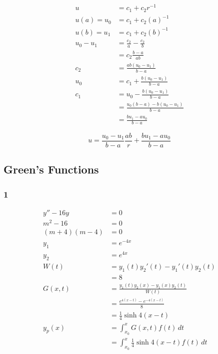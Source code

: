 \documentclass{article}
\begin{document}
\begin{align*}
  u          & = c_1 + c_2 r^{-1}                          \\
  u(a) = u_0 & = c_1 + c_2 (a)^{-1}                        \\
  u(b) = u_1 & = c_1 + c_2 (b)^{-1}                        \\
  u_0 - u_1  & = \frac{c_2}{a} - \frac{c_2}{b}             \\
             & = c_2 \frac{b - a}{a b}                     \\
  c_2        & = \frac{a b (u_0 - u_1)}{b - a}             \\
  u_0        & = c_1 + \frac{b (u_0 - u_1)}{b - a}         \\
  c_1        & = u_0 - \frac{b (u_0 - u_1)}{b - a}         \\
             & = \frac{u_0 (b - a) - b (u_0 - u_1)}{b - a} \\
             & = \frac{b u_1 - a u_0}{b - a}
\end{align*}

\[u = \frac{u_0 - u_1}{b - a} \frac{a b}{r} + \frac{b u_1 - a u_0}{b - a}\]

\subsection{Green's Functions}

\subsubsection{1}

\begin{align*}
  y'' - 16y       & = 0                                                  \\
  m^2 - 16        & = 0                                                  \\
  (m + 4) (m - 4) & = 0                                                  \\
  y_1             & = e^{-4x}                                            \\
  y_2             & = e^{4x}                                             \\
  W(t)            & = y_1(t) y_2'(t) - y_1'(t) y_2(t)                    \\
                  & = 8                                                  \\
  G(x, t)         & = \frac{y_1(t) y_2(x) - y_1(x) y_2(t)}{W(t)}         \\
                  & = \frac{e^{4(x - t)} - e^{-4(x - t)}}{8}             \\
                  & = \frac{1}{4} \sinh 4 (x - t)                        \\
  y_p(x)          & = \int_{x_0}^x G(x, t) f(t) \,dt                     \\
                  & = \int_{x_0}^x \frac{1}{4} \sinh 4 (x - t) f(t) \,dt
\end{align*}
\end{document}
